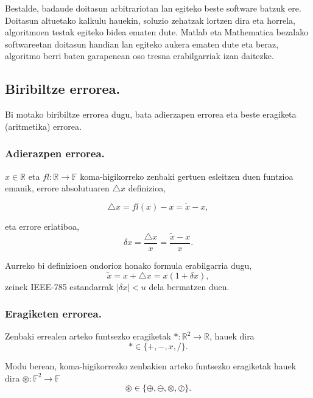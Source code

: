 Bestalde, badaude doitasun arbitrariotan lan egiteko beste software batzuk ere. Doitasun altuetako kalkulu hauekin, soluzio zehatzak lortzen dira eta horrela, algoritmoen testak egiteko bidea ematen dute. Matlab eta Mathematica bezalako softwareetan doitasun handian lan egiteko aukera ematen dute eta beraz, algoritmo berri baten garapenean oso tresna erabilgarriak izan daitezke.

 
\subsection{Biribiltze errorea.}

Bi motako biribiltze errorea dugu, bata adierzapen errorea eta beste eragiketa (aritmetika) errorea.  

\subsubsection*{Adierazpen errorea.} 

$x \in \mathbb{R}$ eta $fl: \mathbb{R} \rightarrow \mathbb{F}$ 
koma-higikorreko zenbaki gertuen esleitzen duen funtzioa emanik, errore absolutuaren  $\triangle x$ definizioa,

\begin{equation*}
\triangle x= fl(x)-x= \tilde{x}-x,  
\end{equation*}    
 
eta errore erlatiboa, 
\begin{equation*}
\delta x =\frac{\triangle x}{x} = \frac{\tilde{x}-x}{x}. 
\end{equation*}

Aurreko bi definizioen ondorioz honako formula erabilgarria dugu,
\begin{equation*}
\tilde{x}= x+\triangle x = x(1+\delta x),
\end{equation*}
zeinek IEEE-785 estandarrak $|\delta x|<u$ dela bermatzen duen.

\subsubsection*{Eragiketen errorea.} 
 
Zenbaki errealen arteko funtsezko eragiketak  $\ast: \mathbb{R}^2\rightarrow \mathbb{R}$, hauek dira
\begin{equation*}
\ast\in \{+,-,x,/ \}.
\end{equation*}

Modu berean, koma-higikorrezko zenbakien arteko funtsezko eragiketak hauek dira $\circledast: \mathbb{F}^2\rightarrow \mathbb{F}$
\begin{equation*}
\circledast\in \{\oplus,\ominus,\otimes,\oslash \}.
\end{equation*}


